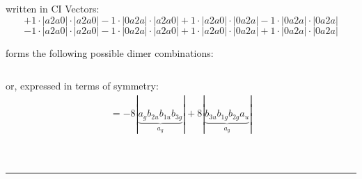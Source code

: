 \documentclass{article}
\begin{document}
\begin{minipage}{\linewidth}
written in CI Vectors: 
 $$+ 1 \cdot \left|a2a0 \right| \cdot \left| a2a0 \right| 
- 1 \cdot \left|0a2a \right| \cdot \left| a2a0 \right| 
+ 1 \cdot \left|a2a0 \right| \cdot \left| 0a2a \right| 
- 1 \cdot \left|0a2a \right| \cdot \left| 0a2a \right| 
 $$ $$ - 1 \cdot \left|a2a0 \right| \cdot \left| a2a0 \right| 
- 1 \cdot \left|0a2a \right| \cdot \left| a2a0 \right| 
+ 1 \cdot \left|a2a0 \right| \cdot \left| 0a2a \right| 
+ 1 \cdot \left|0a2a \right| \cdot \left| 0a2a \right| 
$$



 forms the following possible dimer combinations:

$$$$



\end{minipage}
\vspace{0.5cm}


or, expressed in terms of symmetry:\begin{multline*}
=-8\left|\underbrace{a_{g} b_{2u} b_{1u} b_{3g}}_{a_{g}}\right|+8\left|\underbrace{b_{3u} b_{1g} b_{2g} a_{u}}_{a_{g}}\right|
\end{multline*}\\\\

 


\hrule
\vspace{0.5cm}
\end{document}
